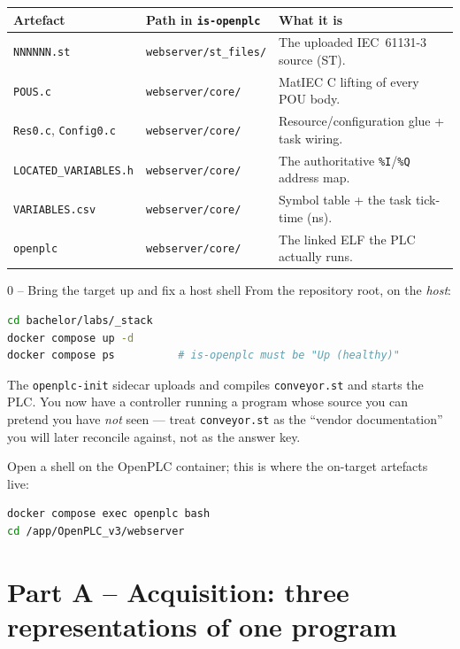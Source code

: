 \documentclass[11pt,a4paper]{article}
\begin{document}
\begin{center}
\footnotesize
\begin{tabular}{@{}p{3.4cm}p{4.2cm}p{6.4cm}@{}}
\toprule
\textbf{Artefact} & \textbf{Path in \texttt{is-openplc}} & \textbf{What it is} \\
\midrule
\texttt{NNNNNN.st}      & \texttt{webserver/st\_files/}      & The uploaded IEC~61131-3 source (ST). \\
\texttt{POUS.c}         & \texttt{webserver/core/}           & MatIEC C lifting of every POU body. \\
\texttt{Res0.c}, \texttt{Config0.c} & \texttt{webserver/core/} & Resource/configuration glue + task wiring. \\
\texttt{LOCATED\_VARIABLES.h} & \texttt{webserver/core/}     & The authoritative \texttt{\%I}/\texttt{\%Q} address map. \\
\texttt{VARIABLES.csv}  & \texttt{webserver/core/}           & Symbol table + the task tick-time (ns). \\
\texttt{openplc}        & \texttt{webserver/core/}           & The linked ELF the PLC actually runs. \\
\bottomrule
\end{tabular}
\end{center}

\begin{stepbox}{0 -- Bring the target up and fix a host shell}
From the repository root, on the \emph{host}:
\begin{lstlisting}[language=bash]
cd bachelor/labs/_stack
docker compose up -d
docker compose ps          # is-openplc must be "Up (healthy)"
\end{lstlisting}
The \texttt{openplc-init} sidecar uploads and compiles
\texttt{conveyor.st} and starts the PLC. You now have a controller running
a program whose source you can pretend you have \emph{not} seen --- treat
\texttt{conveyor.st} as the ``vendor documentation'' you will later
reconcile against, not as the answer key.

\smallskip
Open a shell on the OpenPLC container; this is where the on-target
artefacts live:
\begin{lstlisting}[language=bash]
docker compose exec openplc bash
cd /app/OpenPLC_v3/webserver
\end{lstlisting}
\end{stepbox}

\section*{Part A -- Acquisition: three representations of one program}
\end{document}
